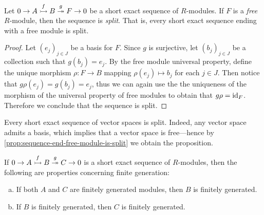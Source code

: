 \begin{proposition}
    \label{prop:sequence-end-free-module-is-split}
    Let \(0 \to A \overset{f}{\rightarrowtail} B \overset{g}{\twoheadrightarrow} F \to 0\) be a short exact
    sequence of \(R\)-modules. If \(F\) is a \emph{free} \(R\)-module, then the
    sequence is \emph{split}. That is, every short exact sequence ending with a free
    module is split.
\end{proposition}

\begin{proof}
    Let \((e_j)_{j \in J}\) be a basis for \(F\). Since \(g\) is surjective, let
    \((b_j)_{j \in J}\) be a collection such that \(g(b_j) = e_j\). By the free
    module universal property, define the unique morphism \(\rho: F \to B\) mapping
    \(\rho(e_j) \mapsto b_j\) for each \(j \in J\). Then notice that
    \(g \rho(e_j) = g(b_j) = e_j\), thus we can again use the the uniqueness of the
    morphism of the universal property of free modules to obtain that
    \(g \rho = \operatorname{id}_F\). Therefore we conclude that the sequence is split.
\end{proof}

\begin{example}
    \label{exp:short-exact-seq-vect-spaces-split}
    Every short exact sequence of vector spaces is split. Indeed, any vector space
    admits a basis, which implies that a vector space is free---hence by
    \cref{prop:sequence-end-free-module-is-split} we obtain the proposition.
\end{example}

\begin{proposition}
    \label{prop:short-exact-finitely-generated}
    If \(0 \to A \overset{f}{\rightarrowtail} B \overset{g}{\twoheadrightarrow} C \to 0\) is a short exact
    sequence of \(R\)-modules, then the following are properties concerning finite
    generation:
    \begin{enumerate}[(a)]\setlength\itemsep{0em}
        \item If both \(A\) and \(C\) are finitely generated modules, then \(B\) is
              finitely generated.

        \item If \(B\) is finitely generated, then \(C\) is finitely generated.
    \end{enumerate}
\end{proposition}

